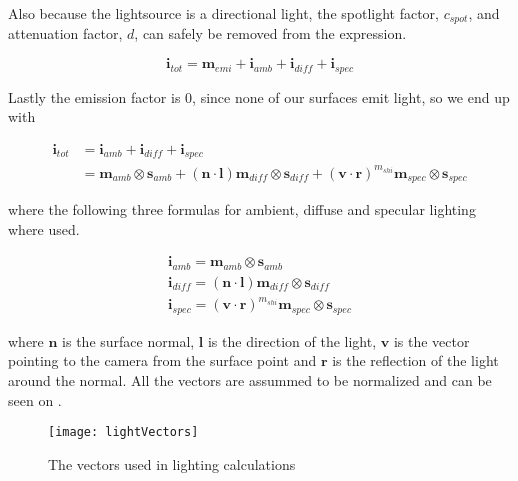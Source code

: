 Also because the lightsource is a directional light, the spotlight
factor, $c_{spot}$, and attenuation factor, $d$, can safely be
removed from the expression.

\begin{displaymath}
  \mathbf{i}_{tot} = \mathbf{m}_{emi} + \mathbf{i}_{amb} + \mathbf{i}_{diff} + \mathbf{i}_{spec}
\end{displaymath}

Lastly the emission factor is 0, since none of our surfaces emit
light, so we end up with

\begin{displaymath}
  \begin{array}{rl}
    \mathbf{i}_{tot} &= \mathbf{i}_{amb} + \mathbf{i}_{diff} +
    \mathbf{i}_{spec}\\
    &= \mathbf{m}_{amb} \otimes \mathbf{s}_{amb} + (\mathbf{n} \cdot
    \mathbf{l}) \mathbf{m}_{diff} \otimes \mathbf{s}_{diff} +
    (\mathbf{v} \cdot \mathbf{r})^{m_{shi}} \mathbf{m}_{spec} \otimes
    \mathbf{s}_{spec} 
  \end{array}
\end{displaymath}

where the following three formulas for ambient, diffuse and specular
lighting where used.

\begin{displaymath}
  \begin{array}{c}
    \mathbf{i}_{amb} = \mathbf{m}_{amb} \otimes \mathbf{s}_{amb} \\
    \mathbf{i}_{diff} = (\mathbf{n} \cdot \mathbf{l}) \mathbf{m}_{diff} \otimes \mathbf{s}_{diff} \\
    \mathbf{i}_{spec} = (\mathbf{v} \cdot \mathbf{r})^{m_{shi}} \mathbf{m}_{spec} \otimes \mathbf{s}_{spec} 
  \end{array}
\end{displaymath}

where $\mathbf{n}$ is the surface normal, $\mathbf{l}$ is the
direction of the light, $\mathbf{v}$ is the vector pointing to the
camera from the surface point and $\mathbf{r}$ is the reflection of the
light around the normal. All the vectors are assummed to be normalized
and can be seen on .

\begin{figure}
  \centering
  \texttt{[image: lightVectors]}
  \caption{The vectors used in lighting calculations}
  \label{fig:lightVectors}
\end{figure}

